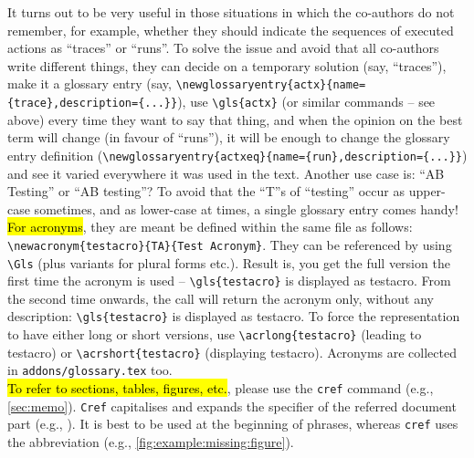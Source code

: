 It turns out to be very useful in those situations in which the co-authors do not remember, for example, whether they should indicate the sequences of executed actions as ``traces'' or ``runs''. To solve the issue and avoid that all co-authors write different things, they can decide on a temporary solution (say, ``traces''), make it a glossary entry (say, \verb+\newglossaryentry{actx}{name={trace},description={...}}+), use \verb+\gls{actx}+ (or similar commands -- see above) every time they want to say that thing, and when the opinion on the best term will change (in favour of ``runs''), it will be enough to change the glossary entry definition (\verb+\newglossaryentry{actxeq}{name={run},description={...}}+) and see it varied everywhere it was used in the text. Another use case is: ``AB Testing'' or ``AB testing''? To avoid that the ``T''s of ``testing'' occur as upper-case sometimes, and as lower-case at times, a single glossary entry comes handy!
%
\\
%
\hl{For acronyms}, they are meant be defined within the same file as follows: \texttt{{\textbackslash}newacronym\{testacro\}\{TA\}\{Test Acronym\}}.
They can be referenced by using \texttt{{\textbackslash}Gls} (plus variants for plural forms etc.).
Result is, you get the full version the first time the acronym is used
-- \texttt{{\textbackslash}gls\{testacro\}} is displayed as \Gls{testacro}.
From the second time onwards, the call will return the acronym only, without any description:
\texttt{{\textbackslash}gls\{testacro\}} is displayed as \Gls{testacro}.
To force the representation to have either long or short versions, use
\texttt{{\textbackslash}acrlong\{testacro\}}
(leading to \acrlong{testacro})
or
\texttt{{\textbackslash}acrshort\{testacro\}}
(displaying \acrshort{testacro}).
Acronyms are collected in \texttt{addons/glossary.tex} too.
%
\\
%
\hl{To refer to sections, tables, figures, etc.}, please use the \texttt{cref} command (e.g., \cref{sec:memo}).
\texttt{Cref} capitalises and expands the specifier of the referred document part (e.g., ). It is best to be used at the beginning of phrases, whereas \texttt{cref} uses the abbreviation (e.g., \cref{fig:example:missing:figure}).
%